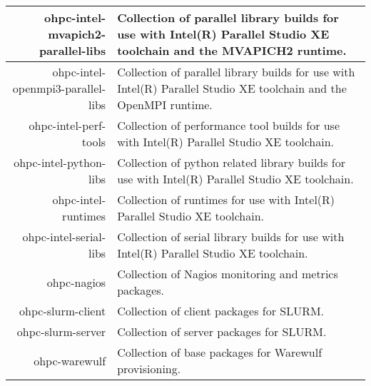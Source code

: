 \begin{tabularx}{\textwidth}{r|X}
\hline
ohpc-intel-mvapich2-parallel-libs & Collection of parallel library builds for use with Intel(R) Parallel Studio XE toolchain and the MVAPICH2 runtime. \\ 
\hline
ohpc-intel-openmpi3-parallel-libs & Collection of parallel library builds for use with Intel(R) Parallel Studio XE toolchain and the OpenMPI runtime. \\ 
\hline
ohpc-intel-perf-tools & Collection of performance tool builds for use with Intel(R) Parallel Studio XE toolchain. \\ 
\hline
ohpc-intel-python-libs & Collection of python related library builds for use with Intel(R) Parallel Studio XE toolchain. \\ 
\hline
ohpc-intel-runtimes & Collection of runtimes for use with Intel(R) Parallel Studio XE toolchain. \\ 
\hline
ohpc-intel-serial-libs & Collection of serial library builds for use with Intel(R) Parallel Studio XE toolchain. \\ 
\hline
ohpc-nagios & Collection of Nagios monitoring and metrics packages. \\ 
\hline
ohpc-slurm-client & Collection of client packages for SLURM. \\ 
\hline
ohpc-slurm-server & Collection of server packages for SLURM. \\ 
\hline
ohpc-warewulf & Collection of base packages for Warewulf provisioning. \\ 
\hline
\bottomrule
\end{tabularx}

